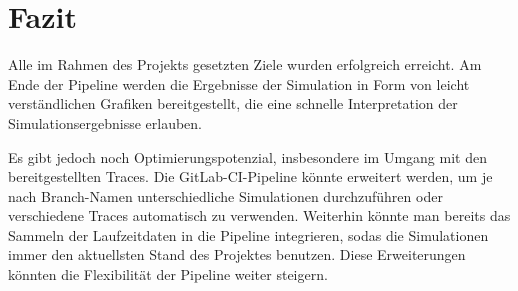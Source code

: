 
\section{Fazit} 
Alle im Rahmen des Projekts gesetzten Ziele wurden erfolgreich erreicht. Am Ende der Pipeline werden die Ergebnisse der Simulation in Form von leicht verständlichen Grafiken bereitgestellt, die eine schnelle Interpretation der Simulationsergebnisse erlauben.

Es gibt jedoch noch Optimierungspotenzial, insbesondere im Umgang mit den bereitgestellten Traces. Die GitLab-CI-Pipeline könnte erweitert werden, um je nach Branch-Namen unterschiedliche Simulationen durchzuführen oder verschiedene Traces automatisch zu verwenden. Weiterhin könnte man bereits das Sammeln der Laufzeitdaten in die Pipeline integrieren, sodas die Simulationen immer den aktuellsten Stand des Projektes benutzen. Diese Erweiterungen könnten die Flexibilität der Pipeline weiter steigern.
